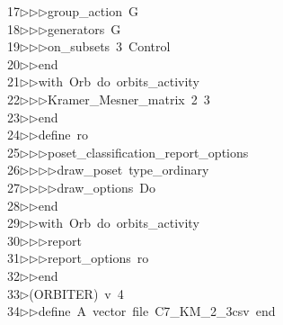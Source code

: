 \begin{tabbing}
17\>$\triangleright$\>$\triangleright$\>$\triangleright$\>group\_action\ G\ \\[0pt]
18\>$\triangleright$\>$\triangleright$\>$\triangleright$\>generators\ G\ \\[0pt]
19\>$\triangleright$\>$\triangleright$\>$\triangleright$\>on\_subsets\ 3\ Control\ \\[0pt]
20\>$\triangleright$\>$\triangleright$\>end\ \\[0pt]
21\>$\triangleright$\>$\triangleright$\>with\ Orb\ do\ orbits\_activity\ \\[0pt]
22\>$\triangleright$\>$\triangleright$\>$\triangleright$\>Kramer\_Mesner\_matrix\ 2\ 3\ \\[0pt]
23\>$\triangleright$\>$\triangleright$\>end\ \\[0pt]
24\>$\triangleright$\>$\triangleright$\>define\ ro\ \\[0pt]
25\>$\triangleright$\>$\triangleright$\>$\triangleright$\>poset\_classification\_report\_options\ \\[0pt]
26\>$\triangleright$\>$\triangleright$\>$\triangleright$\>$\triangleright$\>draw\_poset\ type\_ordinary\ \\[0pt]
27\>$\triangleright$\>$\triangleright$\>$\triangleright$\>$\triangleright$\>draw\_options\ Do\ \\[0pt]
28\>$\triangleright$\>$\triangleright$\>end\ \\[0pt]
29\>$\triangleright$\>$\triangleright$\>with\ Orb\ do\ orbits\_activity\ \\[0pt]
30\>$\triangleright$\>$\triangleright$\>$\triangleright$\>report\ \ \\[0pt]
31\>$\triangleright$\>$\triangleright$\>$\triangleright$\>report\_options\ ro\ \\[0pt]
32\>$\triangleright$\>$\triangleright$\>end\ \\[0pt]
33\>$\triangleright$\>(ORBITER)\ v\ 4\ \\[0pt]
34\>$\triangleright$\>$\triangleright$\>define\ A\ vector\ file\ C7\_KM\_2\_3csv\ end\ \\[0pt]

\end{tabbing}
